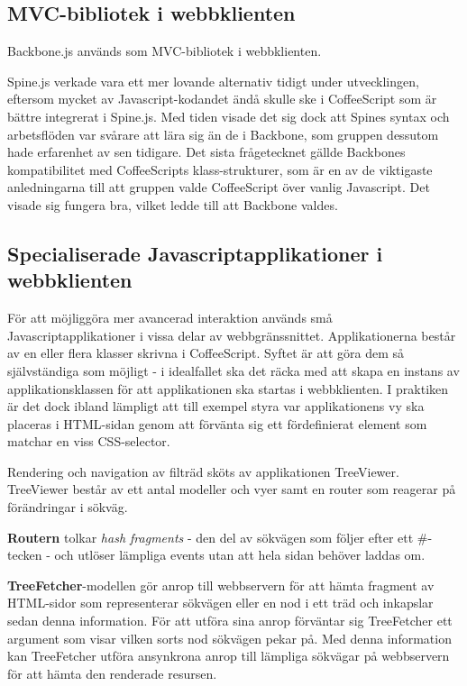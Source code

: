 \subsection{MVC-bibliotek i webbklienten}
Backbone.js används som MVC-bibliotek i webbklienten.

Spine.js verkade vara ett mer lovande alternativ tidigt under utvecklingen, eftersom mycket av Javascript-kodandet ändå skulle ske i CoffeeScript som är bättre integrerat i Spine.js. Med tiden visade det sig dock att Spines syntax och arbetsflöden var svårare att lära sig än de i Backbone, som gruppen dessutom hade erfarenhet av sen tidigare. Det sista frågetecknet gällde Backbones kompatibilitet med CoffeeScripts klass-strukturer, som är en av de viktigaste anledningarna till att gruppen valde CoffeeScript över vanlig Javascript. Det visade sig fungera bra, vilket ledde till att Backbone valdes.

\subsection{Specialiserade Javascriptapplikationer i webbklienten}
För att möjliggöra mer avancerad interaktion används små Javascriptapplikationer i vissa delar av webbgränssnittet. Applikationerna består av en eller flera klasser skrivna i CoffeeScript. Syftet är att göra dem så självständiga som möjligt - i idealfallet ska det räcka med att skapa en instans av applikationsklassen för att applikationen ska startas i webbklienten. I praktiken är det dock ibland lämpligt att till exempel styra var applikationens vy ska placeras i HTML-sidan genom att förvänta sig ett fördefinierat element som matchar en viss CSS-selector.

Rendering och navigation av filträd sköts av applikationen TreeViewer. TreeViewer består av ett antal modeller och vyer samt en router som reagerar på förändringar i sökväg. 

{\bf Routern} tolkar \emph{hash fragments} - den del av sökvägen som följer efter ett \#-tecken - och utlöser lämpliga events utan att hela sidan behöver laddas om.


{\bf TreeFetcher}-modellen gör anrop till webbservern för att hämta fragment av HTML-sidor som representerar sökvägen eller en nod i ett träd och inkapslar sedan denna information. För att utföra sina anrop förväntar sig TreeFetcher ett argument som visar vilken sorts nod sökvägen pekar på. Med denna information kan TreeFetcher utföra ansynkrona anrop till lämpliga sökvägar på webbservern för att hämta den renderade resursen.

